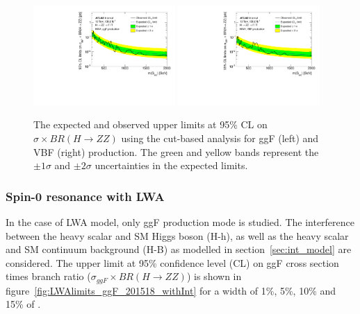 \begin{figure}[h]
    \centering
    \includegraphics[width=0.48\textwidth]{figures/HMHZZ/results/limits_Cut2020_ggF.pdf}
    \includegraphics[width=0.48\textwidth]{figures/HMHZZ/results/limits_Cut2020_VBF.pdf}
    \caption{The expected and observed upper limits at 95\% CL on $\sigma \times BR(H \rightarrow ZZ)$ using the cut-based analysis for ggF (left) and VBF (right) production. The green and yellow bands represent the $\pm 1\sigma$ and $\pm 2\sigma$ uncertainties in the expected limits.
 }
    \label{fig:NWA201518_Cut}
\end{figure}

\subsubsection{Spin-0 resonance with LWA}

In the case of LWA model, only ggF production mode is studied.
The interference between the heavy scalar and SM Higgs boson (H-h), as well as the heavy scalar and SM \ggZZ continuum background (H-B) as modelled in section~\ref{sec:int_model} are considered.
The upper limit at 95\% confidence level (CL) on ggF cross section times branch ratio ($\sigma_{ggF} \times BR(H \rightarrow ZZ)$) is shown in figure~\ref{fig:LWAlimits_ggF_201518_withInt} for a width of 1\%, 5\%, 10\% and 15\% of \mH.

